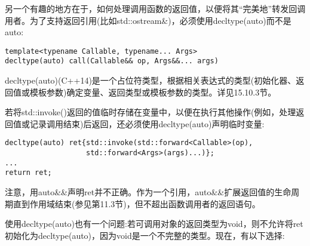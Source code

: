 另一个有趣的地方在于，如何处理调用函数的返回值，以便将其“完美地”转发回调用者。为了支持返回引用(比如std::ostream\&)，必须使用decltype(auto)而不是auto:

\begin{lstlisting}[style=styleCXX]
template<typename Callable, typename... Args>
decltype(auto) call(Callable&& op, Args&&... args)
\end{lstlisting}

decltype(auto)(C++14)是一个占位符类型，根据相关表达式的类型(初始化器、返回值或模板参数)确定变量、返回类型或模板参数的类型。详见15.10.3节。

若将std::invoke()返回的值临时存储在变量中，以便在执行其他操作(例如，处理返回值或记录调用结束)后返回，还必须使用decltype(auto)声明临时变量:

\begin{lstlisting}[style=styleCXX]
decltype(auto) ret{std::invoke(std::forward<Callable>(op),
				   std::forward<Args>(args)...)};
...
return ret;
\end{lstlisting}

注意，用auto\&\&声明ret并不正确。作为一个引用，auto\&\&扩展返回值的生命周期直到作用域结束(参见第11.3节)，但不超出函数调用者的返回语句。

使用decltype(auto)也有一个问题:若可调用对象的返回类型为void，则不允许将ret初始化为decltype(auto)，因为void是一个不完整的类型。现在，有以下选择:

